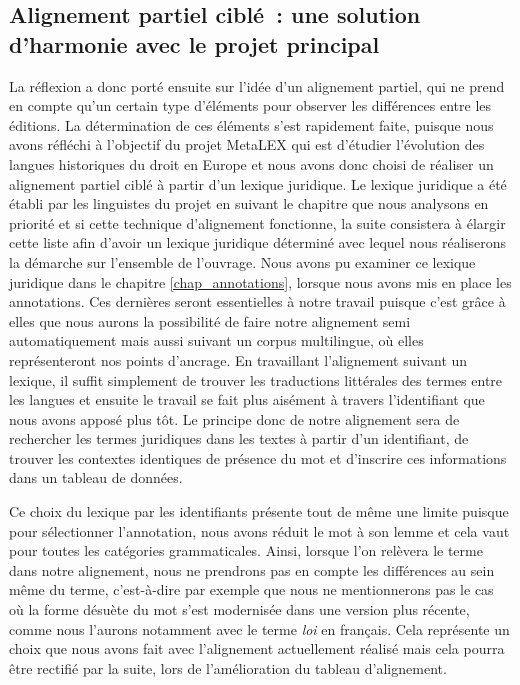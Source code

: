 \subsection{Alignement partiel ciblé~: une solution d’harmonie avec le projet principal}
La réflexion a donc porté ensuite sur l’idée d’un alignement partiel, qui ne prend en compte qu’un certain type d’éléments pour observer les différences entre les éditions. La détermination de ces éléments s’est rapidement faite, puisque nous avons réfléchi à l’objectif du projet MetaLEX qui est d’étudier l’évolution des langues historiques du droit en Europe et nous avons donc choisi de réaliser un alignement partiel ciblé à partir d’un lexique juridique. Le lexique juridique a été établi par les linguistes du projet en suivant le chapitre que nous analysons en priorité et si cette technique d’alignement fonctionne, la suite consistera à élargir cette liste afin d’avoir un lexique juridique déterminé avec lequel nous réaliserons la démarche sur l’ensemble de l’ouvrage. Nous avons pu examiner ce lexique juridique dans le chapitre \ref{chap_annotations}, lorsque nous avons mis en place les annotations. Ces dernières seront essentielles à notre travail puisque c’est grâce à elles que nous aurons la possibilité de faire notre alignement semi automatiquement mais aussi suivant un corpus multilingue, où elles représenteront nos points d’ancrage. En travaillant l’alignement suivant un lexique, il suffit simplement de trouver les traductions littérales des termes entre les langues et ensuite le travail se fait plus aisément à travers l’identifiant que nous avons apposé plus tôt. Le principe donc de notre alignement sera de rechercher les termes juridiques dans les textes à partir d’un identifiant, de trouver les contextes identiques de présence du mot et d’inscrire ces informations dans un tableau de données.

Ce choix du lexique par les identifiants présente tout de même une limite puisque pour sélectionner l’annotation, nous avons réduit le mot à son lemme et cela vaut pour toutes les catégories grammaticales. Ainsi, lorsque l’on relèvera le terme dans notre alignement, nous ne prendrons pas en compte les différences au sein même du terme, c’est-à-dire par exemple que nous ne mentionnerons pas le cas où la forme désuète du mot s’est modernisée dans une version plus récente, comme nous l’aurons notamment avec le terme \textit{loi} en français. Cela représente un choix que nous avons fait avec l’alignement actuellement réalisé mais cela pourra être rectifié par la suite, lors de l’amélioration du tableau d’alignement.

